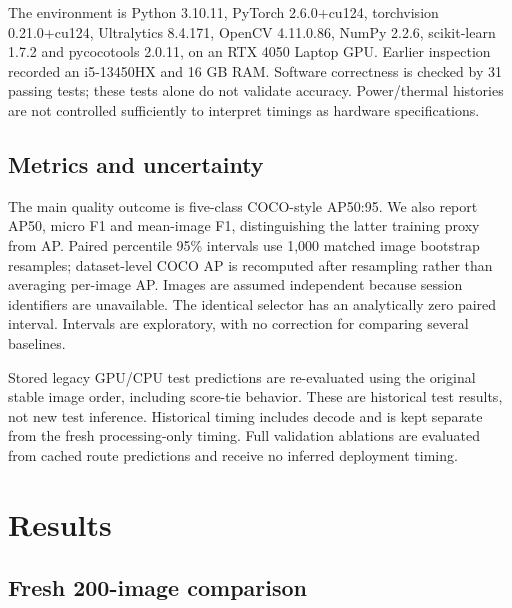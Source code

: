 \documentclass[11pt,a4paper]{article}
\begin{document}
The environment is Python 3.10.11, PyTorch 2.6.0+cu124, torchvision 0.21.0+cu124, Ultralytics 8.4.171, OpenCV 4.11.0.86, NumPy 2.2.6, scikit-learn 1.7.2 and pycocotools 2.0.11, on an RTX 4050 Laptop GPU. Earlier inspection recorded an i5-13450HX and 16 GB RAM. Software correctness is checked by 31 passing tests; these tests alone do not validate accuracy. Power/thermal histories are not controlled sufficiently to interpret timings as hardware specifications.


\subsection{Metrics and uncertainty}

The main quality outcome is five-class COCO-style AP50:95. We also report AP50, micro F1 and mean-image F1, distinguishing the latter training proxy from AP. Paired percentile 95\% intervals use 1,000 matched image bootstrap resamples; dataset-level COCO AP is recomputed after resampling rather than averaging per-image AP. Images are assumed independent because session identifiers are unavailable. The identical selector has an analytically zero paired interval. Intervals are exploratory, with no correction for comparing several baselines.


Stored legacy GPU/CPU test predictions are re-evaluated using the original stable image order, including score-tie behavior. These are historical test results, not new test inference. Historical timing includes decode and is kept separate from the fresh processing-only timing. Full validation ablations are evaluated from cached route predictions and receive no inferred deployment timing.


\section{Results}

\subsection{Fresh 200-image comparison}

\begin{center}\small{}\end{center}
\end{document}
